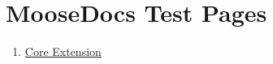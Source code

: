 \documentclass{book}
\begin{document}
\chapter{\label{moosedocs-test-pages}MooseDocs Test Pages}

\begin{enumerate}

\item
\par
\href{core.html}{Core Extension}
\end{enumerate}
\end{document}
